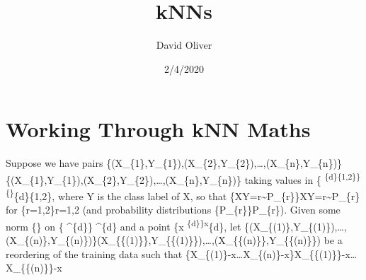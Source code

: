 \documentclass[
]{article}
\title{kNNs}
\author{David Oliver}
\date{2/4/2020}
\begin{document}
\maketitle

\hypertarget{working-through-knn-maths}{%
\section{Working Through kNN Maths}\label{working-through-knn-maths}}

Suppose we have pairs
\{\displaystyle (X\_\{1\},Y\_\{1\}),(X\_\{2\},Y\_\{2\}),\dots ,(X\_\{n\},Y\_\{n\})\}\{\displaystyle (X\_\{1\},Y\_\{1\}),(X\_\{2\},Y\_\{2\}),\dots ,(X\_\{n\},Y\_\{n\})\}
taking values in \{\displaystyle {}
\textsuperscript{\{d\}\times \{1,2\}\}\{\}}\{d\}\times \{1,2\},
where Y is the class label of X, so that
\{\displaystyle X\textbar Y=r\sim P\_\{r\}\}X\textbar Y=r\sim P\_\{r\}
for \{\displaystyle r=1,2\}r=1,2 (and probability distributions
\{\displaystyle P\_\{r\}\}P\_\{r\}). Given some norm
\{\displaystyle \textbar{}\cdot \textbar\}\textbar{}\cdot \textbar{} on
\{\displaystyle {} \^{}\{d\}\} \^{}\{d\} and a point
\{\displaystyle x\in {}
\textsuperscript{\{d\}\}x}\{d\}, let
\{\displaystyle (X\_\{(1)\},Y\_\{(1)\}),\dots ,(X\_\{(n)\},Y\_\{(n)\})\}(X\_\{\{(1)\}\},Y\_\{\{(1)\}\}),\dots ,(X\_\{\{(n)\}\},Y\_\{\{(n)\}\})
be a reordering of the training data such that
\{\displaystyle \textbar X\_\{(1)\}-x\textbar{}\leq \dots \leq \textbar X\_\{(n)\}-x\textbar\}\textbar X\_\{\{(1)\}\}-x\textbar{}\leq \dots \leq \textbar X\_\{\{(n)\}\}-x\textbar{}
\end{document}
